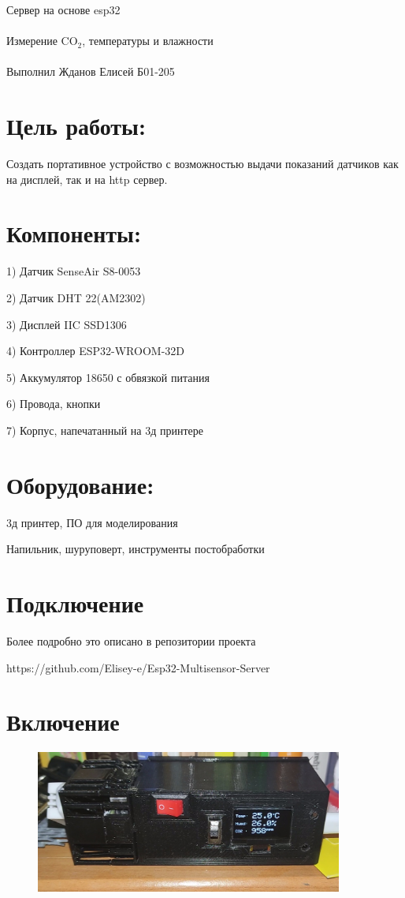 \documentclass{astroedu-lab}
\begin{document}
\pagestyle{plain}

\begin{problem}{\huge Сервер на основе esp32\\\\Измерение CO$_2$, температуры и влажности\\\\Выполнил Жданов Елисей Б01-205}

\section{Цель работы:}

Создать портативное устройство с возможностью выдачи показаний датчиков как на дисплей, так и на http сервер.

\section{Компоненты:}

1) Датчик SenseAir S8-0053

2) Датчик DHT 22(AM2302)

3) Дисплей IIC SSD1306

4) Контроллер ESP32-WROOM-32D

5) Аккумулятор 18650 с обвязкой питания

6) Провода, кнопки

7) Корпус, напечатанный на 3д принтере

\section{Оборудование:}

3д принтер, ПО для моделирования

Напильник, шуруповерт, инструменты постобработки

\section{Подключение}

Более подробно это описано в репозитории проекта

https://github.com/Elisey-e/Esp32-Multisensor-Server

\section{Включение}

\begin{figure}[!h]
	\centering
	\includegraphics[width=0.9\textwidth]{release.jpg}
	\label{fig:boiler}
\end{figure}


\end{problem}
\end{document}
